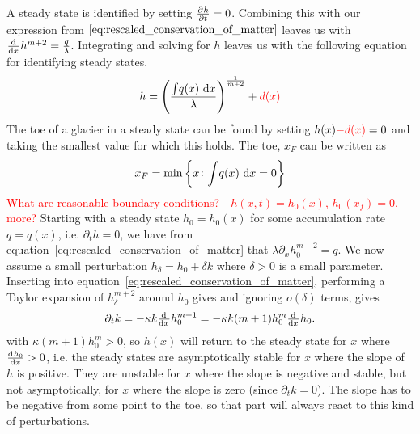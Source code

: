 A steady state is identified by setting $\pd{h}{t} = 0$. Combining this with our expression from $\eqref{eq:rescaled_conservation_of_matter}$ leaves us with $ \od{}{x}h^{m+2} = \frac{q}{\lambda}$. Integrating and solving for $h$ leaves us with the following equation for identifying steady states.
%
\begin{equation}
    h = \left(\frac{{\int}q(x)\,\dif{x}}{\lambda}\right)^{\frac{1}{m+2}} + \red{d(x)}
\end{equation}
%
The toe of a glacier in a steady state can be found by setting $h(x) \textcolor{red}{-d(x)} = 0$ and taking the smallest value for which this holds. The toe, $x_F$ can be written as 
%
\begin{equation}
    x_F = \min\left\{x \colon {\int}q(x)\,\dif{x} = 0\right\}
\end{equation}
%
\textcolor{red}{What are reasonable boundary conditions? - $h(x, t) = h_0(x)$, $h_0(x_f) = 0$, more?}
Starting with a steady state $h_0 = h_0(x)$ for some accumulation rate $q = q(x)$, i.e. $\partial_t h = 0$, we have from equation~\eqref{eq:rescaled_conservation_of_matter} that $\lambda \partial_x h_0^{m+2} = q$. We now assume a small perturbation $h_\delta = h_0 + \delta k$ where $\delta > 0$ is a small parameter. Inserting into equation~\eqref{eq:rescaled_conservation_of_matter}, performing a Taylor expansion of $h_\delta^{m+2}$ around $h_0$ gives and ignoring $o(\delta)$ terms, gives
%
\begin{equation}
    \partial_t k = - \kappa k \od{}{x} h_0^{m+1} = - \kappa k (m+1) h_0^m \od{}{x} h_0.
\end{equation}
%
with $\kappa (m+1) h_0^m > 0$, so $h(x)$ will return to the steady state for $x$ where $\od{h_0}{x} > 0$, i.e. the steady states are asymptotically stable for $x$ where the slope of $h$ is positive. They are unstable for $x$ where the slope is negative and stable, but not asymptotically, for $x$ where the slope is zero (since $\partial_t k = 0$). The slope has to be negative from some point to the toe, so that part will always react to this kind of perturbations.